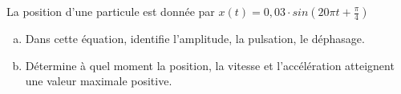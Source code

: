 %
%
    La position d'une particule est donnée par \(x(t)=0,03 \cdot sin(20 \pi t + \frac{\pi}{4})\)
    \begin{enumerate}[a)]
        \item Dans cette équation, identifie l'amplitude, la pulsation, le déphasage.
        \item Détermine à quel moment la position, la vitesse et l'accélération atteignent une valeur maximale positive.
    \end{enumerate}
